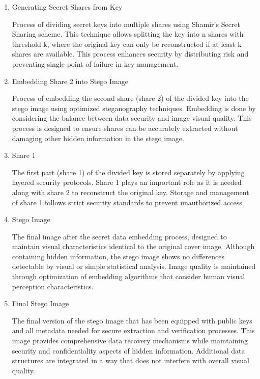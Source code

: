 \documentclass{ittelkom}
\begin{document}
\begin{enumerate}
    \item Generating Secret Shares from Key

          Process of dividing secret keys into multiple shares using Shamir's Secret
          Sharing scheme. This technique allows splitting the key into n shares with
          threshold k, where the original key can only be reconstructed if at least k
          shares are available. This process enhances security by distributing risk and
          preventing single point of failure in key management.

    \item Embedding Share 2 into Stego Image

          Process of embedding the second share (share 2) of the divided key into the
          stego image using optimized steganography techniques. Embedding is done by
          considering the balance between data security and image visual quality. This
          process is designed to ensure shares can be accurately extracted without
          damaging other hidden information in the stego image.

    \item Share 1

          The first part (share 1) of the divided key is stored separately by applying
          layered security protocols. Share 1 plays an important role as it is needed
          along with share 2 to reconstruct the original key. Storage and management of
          share 1 follows strict security standards to prevent unauthorized access.

    \item Stego Image

          The final image after the secret data embedding process, designed to maintain
          visual characteristics identical to the original cover image. Although
          containing hidden information, the stego image shows no differences detectable
          by visual or simple statistical analysis. Image quality is maintained through
          optimization of embedding algorithms that consider human visual perception
          characteristics.

    \item Final Stego Image

          The final version of the stego image that has been equipped with public keys
          and all metadata needed for secure extraction and verification processes. This
          image provides comprehensive data recovery mechanisms while maintaining
          security and confidentiality aspects of hidden information. Additional data
          structures are integrated in a way that does not interfere with overall visual
          quality.


\end{enumerate}
\end{document}
